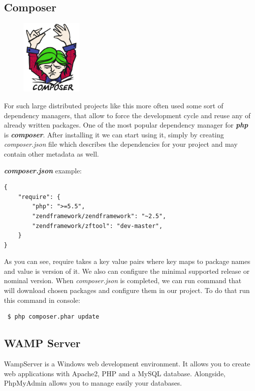     \subsection{Composer}
\begin{figure}
	\includegraphics[width=3cm]{img/zf2/composer-logo.png}
\end{figure} 
For such large distributed projects like this more often used some sort of dependency managers, that allow to force the development cycle and reuse any of already written packages. One of the most popular dependency manager for \textbf{\textit{php}} is \textbf{\textit{composer}}.
After installing it we can start using it, simply by creating \textit{composer.json} file which describes the dependencies for your project and may contain other metadata as well.~\cite{Composer_doc} 

\textbf{\textit{composer.json}} example:

\begin{verbatim}
{
    "require": {
        "php": ">=5.5",
        "zendframework/zendframework": "~2.5",
        "zendframework/zftool": "dev-master",
    }
}
\end{verbatim}

As you can see, require takes a key value pairs where key maps to package names and value is version of it. We also can configure the minimal supported release or nominal version. When \textit{composer.json} is completed, we can run command that will download chosen packages and configure them in our project. To do that run this command in console:
\begin{verbatim}
 $ php composer.phar update
\end{verbatim}

    \subsection{WAMP Server}
	WampServer is a Windows web development environment. It allows you to create web applications with Apache2, PHP and a MySQL database. Alongside, PhpMyAdmin allows you to manage easily your databases\cite{WAMPserver}. 
	
